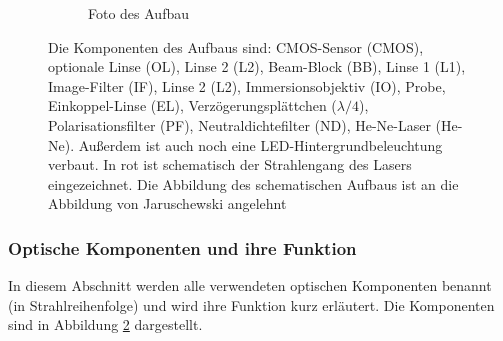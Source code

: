 \documentclass[titlepage]{article}
\begin{document}
\begin{figure}
\begin{subfigure}[b]{0.9\textwidth}
			\caption{Foto des Aufbau}
			\label{fig:aufsicht_aufbau_anotated}
		\end{subfigure}
		\caption[Versuchsaufbau]{Die Komponenten des Aufbaus sind: CMOS-Sensor (CMOS), optionale Linse (OL), Linse 2 (L2), Beam-Block (BB), Linse 1 (L1), Image-Filter (IF), Linse 2 (L2), Immersionsobjektiv (IO), Probe, Einkoppel-Linse (EL), Verzögerungsplättchen ($\lambda/4$), Polarisationsfilter (PF), Neutraldichtefilter (ND), He-Ne-Laser (He-Ne). Außerdem ist auch noch eine LED-Hintergrundbeleuchtung verbaut. In rot ist schematisch der Strahlengang des Lasers eingezeichnet. Die Abbildung des schematischen Aufbaus ist an die Abbildung von Jaruschewski \cite{Jaruschewski.2020} angelehnt}
		\label{fig:Aufbau}
	\end{figure}
	\subsubsection{Optische Komponenten und ihre Funktion}
		In diesem Abschnitt werden alle verwendeten optischen Komponenten benannt (in Strahlreihenfolge) und wird ihre Funktion kurz erläutert. Die Komponenten sind in Abbildung \ref{fig:Aufbau} dargestellt.
\end{document}
